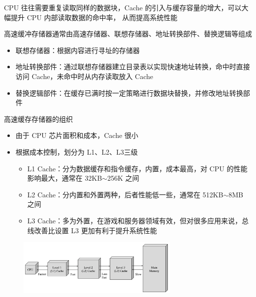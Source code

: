 \documentclass[cs4size,a4paper,10pt]{ctexart}
\begin{document}
	CPU 往往需要重复读取同样的数据块，Cache 的引入与缓存容量的增大，可以大幅提升 CPU 内部读取数据的命中率， 从而提高系统性能

	高速缓冲存储器通常由高速存储器、联想存储器、地址转换部件、替换逻辑等组成
	\begin{itemize}
		\item 联想存储器：根据内容进行寻址的存储器
		\item 地址转换部件：通过联想存储器建立目录表以实现快速地址转换，命中时直接访问 Cache，未命中时从内存读取放入 Cache
		\item 替换逻辑部件：在缓存已满时按一定策略进行数据块替换，并修改地址转换部件
	\end{itemize}

	高速缓存存储器的组织
	\begin{itemize}
		\item 由于 CPU 芯片面积和成本，Cache 很小
		\item 根据成本控制，划分为 L1、L2、L3三级
		\begin{itemize}
			\item L1 Cache：分为数据缓存和指令缓存，内置，成本最高，对 CPU 的性能影响最大，通常在 32KB$\sim$256K 之间
			\item L2 Cache：分内置和外置两种，后者性能低一些，通常在 512KB$\sim$8MB 之间
			\item L3 Cache：多为外置，在游戏和服务器领域有效，但对很多应用来说，总线改善比设置 L3 更加有利于提升系统性能
		\end{itemize}
	\end{itemize}
	\begin{figure}[H]
		\centering
		\includegraphics[width=0.7\textwidth]{img/3.1.4.3}
	\end{figure}
\end{document}
